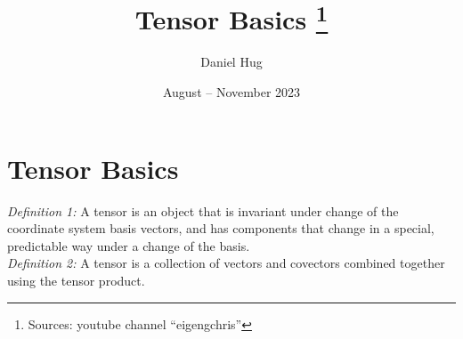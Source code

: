 \documentclass[12pt,oneside,a4paper]{article}
\title{Tensor Basics \footnote{Sources: youtube channel ``eigengchris''}}
\author{Daniel Hug}
\date{August -- November 2023}
\begin{document}
\maketitle


\setlength{\parindent}{0pt}

\section{Tensor Basics}

\emph{Definition 1:} A tensor is an object that is invariant under change of the
coordinate system basis vectors, and has components that change in a special, predictable
way under a change of the basis. \\

\emph{Definition 2:} A tensor is a collection of vectors and covectors combined together
using the tensor product. \\

\newpage







\end{document}
